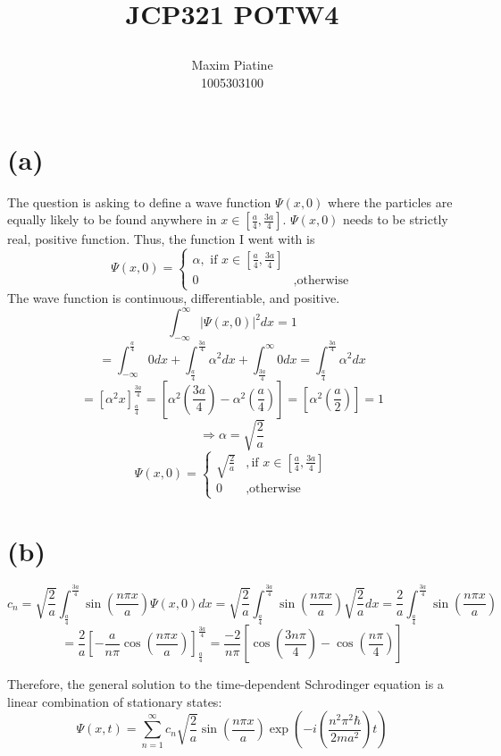 \documentclass[11pt]{article}
\title{\textbf{JCP321 POTW4}
\author{Maxim Piatine\\1005303100}}
\date{}
\begin{document}
\maketitle
\section*{(a)}
The question is asking to define a wave function $\Psi(x,0)$ where the particles are equally likely to be found anywhere in $x\in[\frac{a}{4},\frac{3a}{4}]$. $\Psi(x,0)$ needs to be strictly real, positive function. Thus, the function I went with is 
\[\Psi(x,0)=
\begin{cases}
    \alpha,\text{ if } x\in[\frac{a}{4},\frac{3a}{4}]\\
    0 & , \text{otherwise}
\end{cases}\]
The wave function is continuous, differentiable, and positive. 
\[\int^{\infty}_{-\infty}|\Psi(x,0)|^2dx = 1\]
\[=\int_{-\infty}^{\frac{a}{4}}0 dx+
\int^{\frac{3a}{4}}_{\frac{a}{4}} \alpha^2 dx+\int_{\frac{3a}{4}}^{\infty}0dx=
\int^{\frac{3a}{4}}_{\frac{a}{4}} \alpha^2 dx\]
\[=\left[
\alpha^2x
\right]^{\frac{3a}{4}}_{\frac{a}{4}}=[\alpha^2(\frac{3a}{4})-\alpha^2(\frac{a}{4})]=[\alpha^2(\frac{a}{2})]=1\]
\[\Rightarrow \alpha=\sqrt{\frac{2}{a}}\]
\[\Psi(x,0)=\begin{cases}
    \sqrt{\frac{2}{a}} & ,\text{if } x\in[\frac{a}{4},\frac{3a}{4}]\\
    0 & ,\text{otherwise}
\end{cases}\]

\newpage
\section*{(b)}
\[c_n=\sqrt{\frac{2}{a}}\int^{\frac{3a}{4}}_{\frac{a}{4}}\sin{\left( \frac{n\pi x}{a}\right)}\Psi(x,0)dx=\sqrt{\frac{2}{a}}\int^{\frac{3a}{4}}_{\frac{a}{4}}\sin{\left( \frac{n\pi x}{a}\right)}\sqrt{\frac{2}{a}}dx=\frac{2}{a}\int^{\frac{3a}{4}}_{\frac{a}{4}}\sin{\left( \frac{n\pi x}{a}\right)}\]
\[=\frac{2}{a}\left[ -\frac{a}{n\pi}\cos{\left(\frac{n\pi x}{a}\right)}\right]^{\frac{3a}{4}}_{\frac{a}{4}}=\frac{-2}{n\pi}\left[ \cos{\left(\frac{3n\pi}{4}\right)}-\cos{\left(\frac{n\pi}{4}\right)}\right]\]

Therefore, the general solution to the time-dependent Schrodinger equation is a linear combination of stationary states:
\[\Psi(x,t)=\sum_{n=1}^{\infty}c_n \sqrt{\frac{2}{a}}\sin{(\frac{n\pi x}{a})}\exp{\left(-i(\frac{n^2\pi^2\hbar}{2ma^2})t\right)}\]
\end{document}
